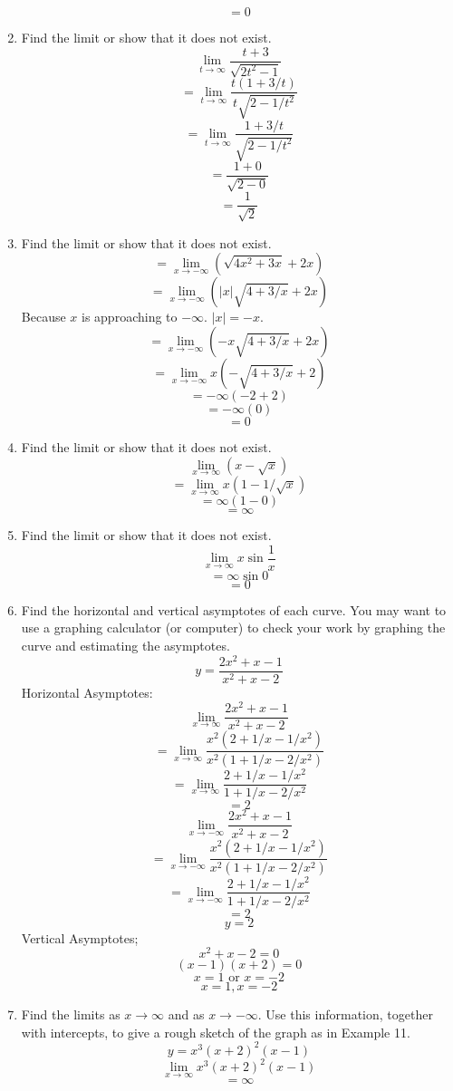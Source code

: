 \documentclass[12pt]{article}
\begin{document}
\begin{enumerate}
    \[\boxed{= 0}\]
    \setcounter{enumi}{17}
    \item Find the limit or show that it does not exist.
    \[\lim_{t \to \infty}\frac{t+3}{\sqrt{2t^2-1}}\]
    \[=\lim_{t \to \infty}\frac{t(1+3/t)}{t\sqrt{2-1/t^2}}\]
    \[=\lim_{t \to \infty}\frac{1+3/t}{\sqrt{2-1/t^2}}\]
    \[=\frac{1+0}{\sqrt{2-0}}\]
    \[\boxed{=\frac{1}{\sqrt{2}}}\]
    \setcounter{enumi}{25}
    \item Find the limit or show that it does not exist.
    \[=\lim_{x \to -\infty}(\sqrt{4x^2 + 3x} + 2x)\]
    \[=\lim_{x \to -\infty}(|x|\sqrt{4 + 3/x} + 2x)\]
    Because $x$ is approaching to $-\infty$. $|x| = -x$.
    \[=\lim_{x \to -\infty}(-x\sqrt{4 + 3/x} + 2x)\]
    \[=\lim_{x \to -\infty}x(-\sqrt{4 + 3/x} + 2)\]
    \[=-\infty(-2 + 2)\]
    \[=-\infty(0)\]
    \[\boxed{=0}\]
    \newpage
    \setcounter{enumi}{27}
    \item Find the limit or show that it does not exist.
    \[\lim_{x \to \infty}(x - \sqrt{x})\]
    \[=\lim_{x \to \infty}x(1 - 1/\sqrt{x})\]
    \[=\infty(1 - 0)\]
    \[\boxed{=\infty}\]
    \setcounter{enumi}{30}
    \item Find the limit or show that it does not exist.
    \[\lim_{x\to \infty}x\sin\frac{1}{x}\]
    \[=\infty\sin 0\]
    \[\boxed{=0}\]
    \setcounter{enumi}{36}
    \item Find the horizontal and vertical asymptotes of each curve. You may want to use a graphing calculator (or computer) to check your work by graphing the curve and estimating the asymptotes.
    \[y = \frac{2x^2 + x - 1}{x^2 + x - 2}\]
    Horizontal Asymptotes:
    \[\lim_{x\to \infty}\frac{2x^2 + x - 1}{x^2 + x - 2}\]
    \[=\lim_{x\to \infty}\frac{x^2(2 + 1/x - 1/x^2)}{x^2(1 + 1/x - 2/x^2)}\]
    \[=\lim_{x\to \infty}\frac{2 + 1/x - 1/x^2}{1 + 1/x - 2/x^2}\]
    \[\boxed{=2}\]
    \[\lim_{x\to -\infty}\frac{2x^2 + x - 1}{x^2 + x - 2}\]
    \[=\lim_{x\to -\infty}\frac{x^2(2 + 1/x - 1/x^2)}{x^2(1 + 1/x - 2/x^2)}\]
    \[=\lim_{x\to -\infty}\frac{2 + 1/x - 1/x^2}{1 + 1/x - 2/x^2}\]
    \[\boxed{=2}\]
    \[\boxed{y = 2}\]
    Vertical Asymptotes;
    \[x^2 + x - 2 = 0\]
    \[(x-1)(x+2) = 0\]
    \[\boxed{x=1\text{ or }x=-2}\]
    \[\boxed{x = 1, x = -2}\]
    \newpage
    \setcounter{enumi}{53}
    \item Find the limits as $x \to \infty$ and as $x \to -\infty$. Use this information, together with intercepts, to give a rough sketch of the graph as in Example 11.
    \[y = x^3(x + 2)^2(x-1)\]
    \[\lim_{x\to \infty}x^3(x + 2)^2(x-1)\]
    \[\boxed{=\infty}\]

\end{enumerate}
\end{document}
